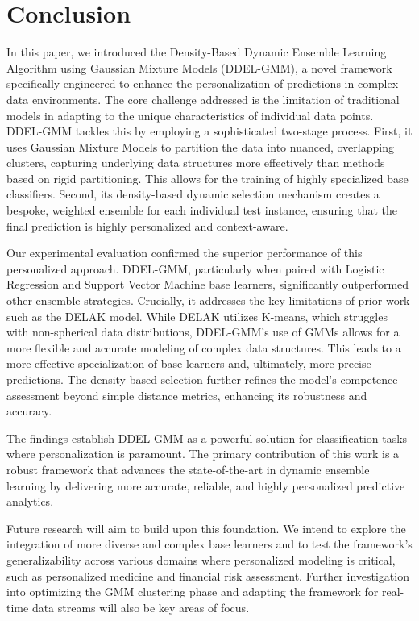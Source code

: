 \documentclass[lettersize,journal]{IEEEtran}
\begin{document}
	
	\section{Conclusion}
	\noindent
	
	In this paper, we introduced the Density-Based Dynamic Ensemble Learning Algorithm using Gaussian Mixture Models (DDEL-GMM), a novel framework specifically engineered to enhance the personalization of predictions in complex data environments. The core challenge addressed is the limitation of traditional models in adapting to the unique characteristics of individual data points. DDEL-GMM tackles this by employing a sophisticated two-stage process. First, it uses Gaussian Mixture Models to partition the data into nuanced, overlapping clusters, capturing underlying data structures more effectively than methods based on rigid partitioning. This allows for the training of highly specialized base classifiers. Second, its density-based dynamic selection mechanism creates a bespoke, weighted ensemble for each individual test instance, ensuring that the final prediction is highly personalized and context-aware.
	
	Our experimental evaluation confirmed the superior performance of this personalized approach. DDEL-GMM, particularly when paired with Logistic Regression and Support Vector Machine base learners, significantly outperformed other ensemble strategies. Crucially, it addresses the key limitations of prior work such as the DELAK model. While DELAK utilizes K-means, which struggles with non-spherical data distributions, DDEL-GMM's use of GMMs allows for a more flexible and accurate modeling of complex data structures. This leads to a more effective specialization of base learners and, ultimately, more precise predictions. The density-based selection further refines the model's competence assessment beyond simple distance metrics, enhancing its robustness and accuracy.
	
	The findings establish DDEL-GMM as a powerful solution for classification tasks where personalization is paramount. The primary contribution of this work is a robust framework that advances the state-of-the-art in dynamic ensemble learning by delivering more accurate, reliable, and highly personalized predictive analytics.
	
	Future research will aim to build upon this foundation. We intend to explore the integration of more diverse and complex base learners and to test the framework’s generalizability across various domains where personalized modeling is critical, such as personalized medicine and financial risk assessment. Further investigation into optimizing the GMM clustering phase and adapting the framework for real-time data streams will also be key areas of focus.
	
	
	
	
\end{document}
